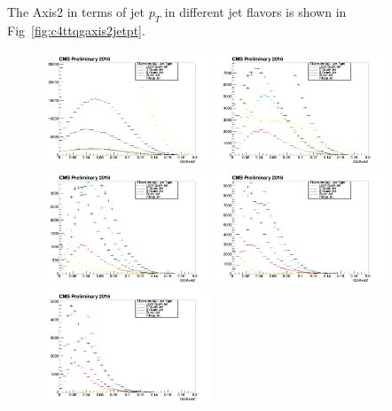 The Axis2 in terms of jet $p_{T}$ in different jet flavors is shown in Fig~\ref{fig:c4ttqgaxis2jetpt}.
\begin{figure}[htbp]
 \begin{center}
  \includegraphics[width=0.45\textwidth]{sections/mc4/TopTagger/figures/_b_qgaxis2jetptbin0_.png}
  \includegraphics[width=0.45\textwidth]{sections/mc4/TopTagger/figures/_b_qgaxis2jetptbin1_.png} \\
  \includegraphics[width=0.45\textwidth]{sections/mc4/TopTagger/figures/_b_qgaxis2jetptbin2_.png}
  \includegraphics[width=0.45\textwidth]{sections/mc4/TopTagger/figures/_b_qgaxis2jetptbin3_.png} \\
  \includegraphics[width=0.45\textwidth]{sections/mc4/TopTagger/figures/_b_qgaxis2jetptbin4_.png}

\end{center}
\end{figure}
